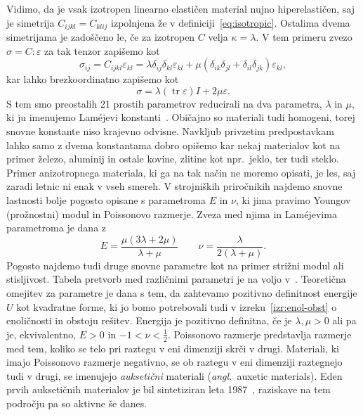 \documentclass[12pt,a4paper,twoside]{article}
\theoremstyle{definition} %
\theoremstyle{plain} %
\numberwithin{equation}{section}
\newcommand{\eps}{\varepsilon}
\newcommand{\ts}{\sigma}
\DeclareMathOperator{\tr}{tr}
\newcommand{\ang}[1]{(\hspace{-1.5px}\textit{angl.}\ #1)}
\begin{document}
Vidimo, da je vsak izotropen linearno elastičen material nujno hiperelastičen, saj je simetrija
$C_{ijkl} = C_{klij}$ izpolnjena že v definiciji~\eqref{eq:isotropic}. Ostalima dvema simetrijama
je zadoščeno le, če za izotropen $C$ velja $\kappa = \lambda$.
V tem primeru zvezo $\ts = C:\eps$ za tak tenzor zapišemo kot
\begin{equation}
  \sigma_{ij} = C_{ijkl}\eps_{kl} = \lambda \delta_{ij}\delta_{kl} \eps_{kl} +
  \mu(\delta_{ik}\delta_{jl} + \delta_{il}\delta_{jk})\eps_{kl},
\end{equation}
kar lahko brezkoordinatno zapišemo kot
\begin{equation}
  \ts = \lambda (\tr\eps)I + 2\mu \eps.
  \label{eq:hooke-isotropic}
\end{equation}
S tem smo preostalih 21 prostih parametrov reducirali na dva parametra, $\lambda$ in $\mu$, ki ju
imenujemo Lam\'{e}jevi konstanti~\cite[str.\ 211]{slaughter2012linearized}. Običajno so materiali
tudi homogeni, torej snovne konstante niso krajevno odvisne. Navkljub privzetim predpostavkam lahko
samo z dvema konstantama dobro opišemo kar nekaj materialov kot na primer železo, aluminij in ostale
kovine, zlitine kot npr.~jeklo, ter tudi steklo. Primer anizotropnega materiala, ki ga na tak način
ne moremo opisati, je les, saj zaradi letnic ni enak v vseh smereh. V strojniških priročnikih
najdemo snovne lastnosti bolje pogosto opisane s parametroma $E$ in $\nu$, ki jima pravimo Youngov
(prožnostni) modul in Poissonovo razmerje. Zveza med njima in Lam\'{e}jevima parametroma je dana z
\begin{equation}
   E = \frac{\mu(3\lambda+2\mu)}{\lambda+\mu} \qquad \nu = \frac{\lambda}{2(\lambda+\mu)}.
\end{equation}
Pogosto najdemo tudi druge snovne parametre kot na primer strižni modul ali stisljivost. Tabela
pretvorb med različnimi parametri je na voljo v~\cite[tabela 5.1,
str.~215]{slaughter2012linearized}. Teoretična omejitev za parametre je dana s tem, da zahtevamo
pozitivno definitnost energije $U$ kot kvadratne forme, ki jo bomo potrebovali tudi v
izreku~\ref{izr:enol-obst} o enoličnosti in obstoju rešitev. Energija je pozitivno definitna,
če je $\lambda, \mu > 0$ ali pa je, ekvivalentno, $E > 0$ in $-1 < \nu < \frac12$.
Poissonovo razmerje predstavlja razmerje med tem, koliko se telo pri raztegu v eni dimenziji
skrči v drugi. Materiali, ki imajo Poissonovo razmerje negativno, se ob raztegu v eni dimenziji
raztegnejo tudi v drugi, se imenujejo \emph{auksetični} materiali \ang{auxetic materials}.
Eden prvih auksetičnih materialov je bil sintetiziran leta 1987~\cite{lakes1987foam}, raziskave na
tem področju pa so aktivne še danes.
\end{document}
